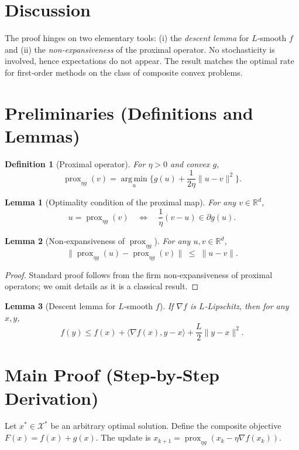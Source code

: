 \documentclass[11pt]{article}
\newtheorem{lemma}{Lemma}
\newtheorem{definition}{Definition}
\newcommand{\prox}{\operatorname{prox}}
\newcommand{\argmin}{\operatorname*{arg\,min}}
\begin{document}
\section*{Discussion}
The proof hinges on two elementary tools: (i) the \emph{descent lemma} for $L$‑smooth $f$ and (ii) the \emph{non‑expansiveness} of the proximal operator. No stochasticity is involved, hence expectations do not appear. The result matches the optimal rate for first‑order methods on the class of composite convex problems.

\newpage
\section*{Preliminaries (Definitions and Lemmas)}
\begin{definition}[Proximal operator]
For $\eta>0$ and convex $g$, 
\[
\prox_{\eta g}(v)=\argmin_{u}\Big\{g(u)+\frac{1}{2\eta}\|u-v\|^{2}\Big\}.
\]
\end{definition}

\begin{lemma}[Optimality condition of the proximal map]\label{lem:opt}
For any $v\in\mathbb{R}^{d}$,
\[
u=\prox_{\eta g}(v)\quad\Longleftrightarrow\quad 
\frac{1}{\eta}(v-u)\in\partial g(u).
\]
\end{lemma}

\begin{lemma}[Non‑expansiveness of $\prox_{\eta g}$]\label{lem:nonexp}
For any $u,v\in\mathbb{R}^{d}$,
\[
\big\|\prox_{\eta g}(u)-\prox_{\eta g}(v)\big\|\;\le\;\|u-v\|.
\]
\end{lemma}
\begin{proof}
Standard proof follows from the firm non‑expansiveness of proximal operators; we omit details as it is a classical result.
\end{proof}

\begin{lemma}[Descent lemma for $L$‑smooth $f$]\label{lem:descent}
If $\nabla f$ is $L$‑Lipschitz, then for any $x,y$,
\[
f(y)\le f(x)+\langle\nabla f(x),y-x\rangle+\frac{L}{2}\|y-x\|^{2}.
\]
\end{lemma}

\section*{Main Proof (Step‑by‑Step Derivation)}
Let $x^{*}\in\mathcal{X}^{*}$ be an arbitrary optimal solution. Define the composite objective $F(x)=f(x)+g(x)$.  
The update is $x_{k+1}= \prox_{\eta g}(x_{k}-\eta\nabla f(x_{k}))$.
\end{document}
